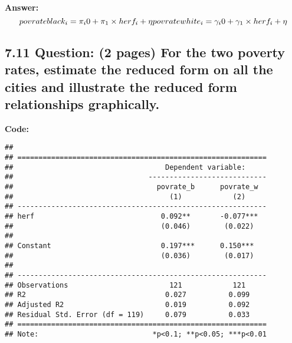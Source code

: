 \documentclass[
]{article}
\newenvironment{Shaded}{\begin{snugshade}}{\end{snugshade}}
\newcommand{\AttributeTok}[1]{\textcolor[rgb]{0.13,0.29,0.53}{#1}}
\newcommand{\ConstantTok}[1]{\textcolor[rgb]{0.56,0.35,0.01}{#1}}
\newcommand{\FunctionTok}[1]{\textcolor[rgb]{0.13,0.29,0.53}{\textbf{#1}}}
\newcommand{\NormalTok}[1]{#1}
\newcommand{\OtherTok}[1]{\textcolor[rgb]{0.56,0.35,0.01}{#1}}
\newcommand{\SpecialCharTok}[1]{\textcolor[rgb]{0.81,0.36,0.00}{\textbf{#1}}}
\newcommand{\StringTok}[1]{\textcolor[rgb]{0.31,0.60,0.02}{#1}}
\begin{document}
\textbf{Answer:} \[
povrateblack_i = \pi_i0 + \pi_1 \times herf_i + \eta\\
povratewhite_i = \gamma_i0 + \gamma_1 \times herf_i + \eta
\]

\clearpage

\hypertarget{question-2-pages-for-the-two-poverty-rates-estimate-the-reduced-form-on-all-the-cities-and-illustrate-the-reduced-form-relationships-graphically.}{%
\subsection{7.11 Question: (2 pages) For the two poverty rates, estimate
the reduced form on all the cities and illustrate the reduced form
relationships
graphically.}\label{question-2-pages-for-the-two-poverty-rates-estimate-the-reduced-form-on-all-the-cities-and-illustrate-the-reduced-form-relationships-graphically.}}

\textbf{Code:}

\begin{Shaded}
\end{Shaded}

\begin{verbatim}
## 
## ===========================================================
##                                    Dependent variable:     
##                                ----------------------------
##                                  povrate_b      povrate_w  
##                                     (1)            (2)     
## -----------------------------------------------------------
## herf                              0.092**       -0.077***  
##                                   (0.046)        (0.022)   
##                                                            
## Constant                          0.197***      0.150***   
##                                   (0.036)        (0.017)   
##                                                            
## -----------------------------------------------------------
## Observations                        121            121     
## R2                                 0.027          0.099    
## Adjusted R2                        0.019          0.092    
## Residual Std. Error (df = 119)     0.079          0.033    
## ===========================================================
## Note:                           *p<0.1; **p<0.05; ***p<0.01
\end{verbatim}
\end{document}
